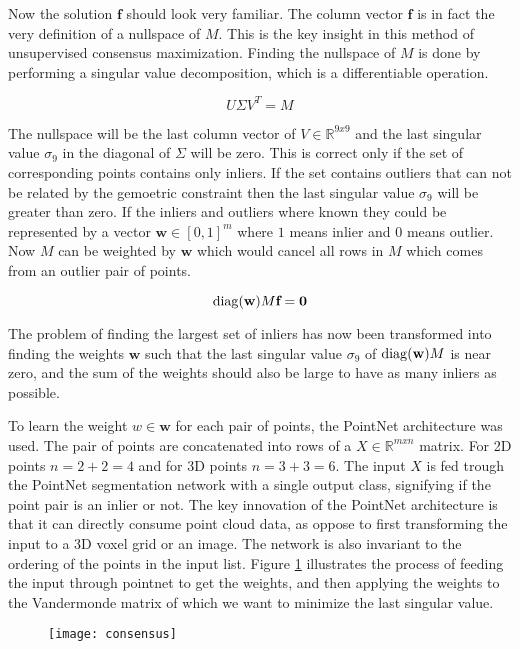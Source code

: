 Now the solution $\textbf{f}$ should look very familiar. The column vector $\textbf{f}$ is in fact the very definition of a nullspace of $M$. This is the key insight in this method of unsupervised consensus maximization. Finding the nullspace of $M$ is done by performing a singular value decomposition, which is a differentiable operation.

\[
U\Sigma V^T=M
\]

The nullspace will be the last column vector of $V \in \mathbb{R}^{9x9}$ and the last singular value $\sigma_9$ in the diagonal of $\Sigma$ will be zero. This is correct only if the set of corresponding points contains only inliers. If the set contains outliers that can not be related by the gemoetric constraint then the last singular value $\sigma_9$ will be greater than zero. If the inliers and outliers where known they could be represented by a vector $\textbf{w} \in [0,1]^m$ where $ 1 $ means inlier and $ 0 $ means outlier. Now $M$ can be weighted by $\textbf{w}$ which would cancel all rows in $M$ which comes from an outlier pair of points.

\[
\operatorname{diag}(\textbf{w}) M \textbf{f} = \textbf{0}
\] 

The problem of finding the largest set of inliers has now been transformed into finding the weights $\textbf{w}$ such that the last singular value $\sigma_9$ of $\operatorname{diag}(\textbf{w})M$ is near zero, and the sum of the weights should also be large to have as many inliers as possible.

To learn the weight $w \in \textbf{w}$ for each pair of points, the PointNet\cite{pointnet} architecture was used. The pair of points are concatenated into rows of a $ X \in \mathbb{R}^{mxn} $ matrix. For 2D points $n = 2+2=4$ and for 3D points $n=3+3=6$. The input $X$ is fed trough the PointNet segmentation network with a single output class, signifying if the point pair is an inlier or not. The key innovation of the PointNet architecture is that it can directly consume point cloud data, as oppose to first transforming the input to a 3D voxel grid or an image. The network is also invariant to the ordering of the points in the input list. Figure \ref{fig:consensus} illustrates the process of feeding the input through pointnet to get the weights, and then applying the weights to the Vandermonde matrix of which we want to minimize the last singular value.

\begin{figure}[H]
	\centering
	\texttt{[image: consensus]}
	\caption{}
	\label{fig:consensus}
\end{figure}

